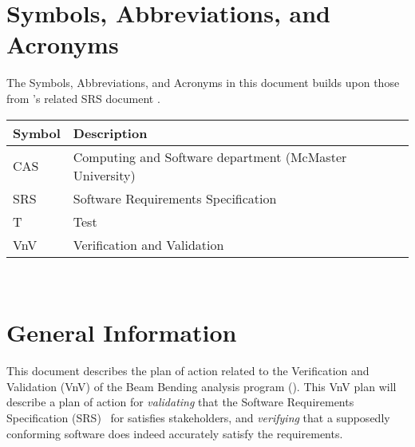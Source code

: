 \documentclass[12pt, titlepage]{article}
\begin{document}
\listoftables


\newpage

\section{Symbols, Abbreviations, and Acronyms}

The Symbols, Abbreviations, and Acronyms in this document builds upon those from
\progname{}'s related SRS document \cite{BalaciBeamBendingSRS2023}.\\

\renewcommand{\arraystretch}{1.2}
\begin{tabular}{l l}
    \toprule
    \textbf{Symbol} & \textbf{Description}                                    \\
    \midrule
    CAS             & Computing and Software department (McMaster University) \\
    SRS             & Software Requirements Specification                     \\
    T               & Test                                                    \\
    VnV             & Verification and Validation                             \\
    \bottomrule
\end{tabular}\\

\newpage



\section{General Information}

This document describes the plan of action related to the Verification and
Validation (VnV) of the Beam Bending analysis program (\progname{}). This VnV
plan will describe a plan of action for \textit{validating} that the Software
Requirements Specification (SRS)~\cite{BalaciBeamBendingSRS2023} for \progname{}
satisfies stakeholders, and \textit{verifying} that a supposedly conforming
software does indeed accurately satisfy the requirements.
\end{document}
